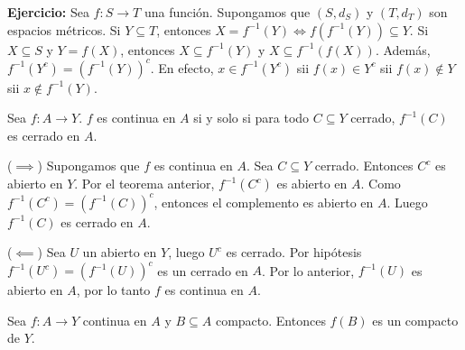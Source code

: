 
\begin{example}
\textbf{Ejercicio:} Sea $f:S\longrightarrow T$ una función. %
Supongamos que $(S, d_S)$ y $(T, d_T)$ son espacios métricos. %
Si $Y \subseteq T$, entonces $X=f^{-1}(Y) \Leftrightarrow f(f^{-1}(Y))\subseteq Y$. %
Si $X \subseteq S$ y $Y=f(X)$, entonces $X\subseteq f^{-1}(Y)$ y $X \subseteq f^{-1}(f(X))$. %
Además, $f^{-1}(Y^{c})=(f^{-1}(Y))^{c}$. %
En efecto, $x\in f^{-1}(Y^{c})$ sii $f(x)\in Y^{c}$ sii $f(x)\notin Y$ sii $x\notin f^{-1}(Y)$. %
\end{example}

\begin{teorema}
Sea $f: A \to Y$. $f$ es continua en $A$ si y solo si para todo $C \subseteq Y$ cerrado, $f^{-1}(C)$ es cerrado en $A$. %
\end{teorema}

\begin{dem}
($\implies$) Supongamos que $f$ es continua en $A$. %
Sea $C \subseteq Y$ cerrado. Entonces $C^{c}$ es abierto en $Y$. %
Por el teorema anterior, $f^{-1}(C^{c})$ es abierto en $A$. %
Como $f^{-1}(C^{c})=(f^{-1}(C))^{c}$, entonces el complemento es abierto en $A$. Luego $f^{-1}(C)$ es cerrado en $A$. %

($\impliedby$) Sea $U$ un abierto en $Y$, luego $U^{c}$ es cerrado. %
Por hipótesis $f^{-1}(U^{c})=(f^{-1}(U))^{c}$ es un cerrado en $A$. %
Por lo anterior, $f^{-1}(U)$ es abierto en $A$, por lo tanto $f$ es continua en $A$. %
\end{dem}

\begin{teorema}
Sea $f:A\rightarrow Y$ continua en $A$ y $B\subseteq A$ compacto. Entonces $f(B)$ es un compacto de $Y$. %
\end{teorema}

